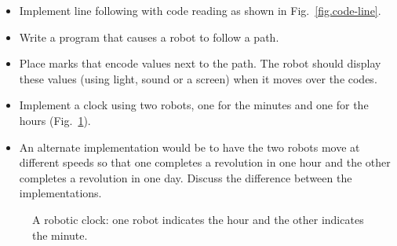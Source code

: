 \begin{framed}
\begin{itemize}
\item Implement line following with code reading as shown in Fig.~\ref{fig.code-line}.
\item Write a program that causes a robot to follow a path.
\item Place marks that encode values next to the path. The robot should display these values (using light, sound or a screen) when it moves over the codes.
\end{itemize}
\end{framed}

\begin{framed}
\begin{itemize}
\item Implement a clock using two robots, one for the minutes and one for the hours (Fig.~\ref{fig.line-clock}).
\item An alternate implementation would be to have the two robots move at different speeds so that one completes a revolution in one hour and the other completes a revolution in one day. Discuss the difference between the implementations.
\end{itemize}
\end{framed}

\begin{figure}
\begin{center}
\end{center}
\caption{A robotic clock: one robot indicates the hour and the other indicates the minute.}\label{fig.line-clock}
\end{figure}

